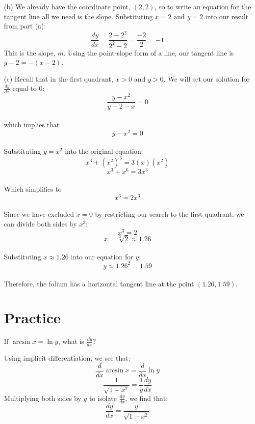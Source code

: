 (b) We already have the coordinate point, $(2, 2)$, so to write an 
equation for the tangent line all we need is the slope. Substituting 
$x=2 \text{ and }y=2$ into our result from part (a):
$$\frac{dy}{dx}=\frac{2-2^2}{2^2-2}=\frac{-2}{2}=-1$$
This is the slope, $m$. Using the point-slope form of a line, our 
tangent line is $y-2=-(x-2)$. 

(c) Recall that in the first quadrant, $x > 0$ and $y > 0$. We will 
set our solution for $\frac{dy}{dx}$  equal to 0:
$$\frac{y-x^2}{y+2-x} = 0$$ \\
which implies that $$y - x^2 = 0$$ \\
Substituting $y = x^2$ into the original equation: 
$$x^3 + (x^2)^3 = 3(x)(x^2)$$ 
$$x^3 + x^6 = 3x^3$$ \\
Which simplifies to 
$$x^6 = 2x^3$$\\
Since we have excluded $x = 0$ by restricting our search to the first 
quadrant, we can divide both sides by $x^3$: 
$$x^3 = 2$$ 
$$x = \sqrt[3]{2} \approx 1.26$$\\
Substituting $x \approx 1.26$ into our equation for $y$: 
$$y \approx 1.26^2 = 1.59$$\\ 
Therefore, the folium has a horizontal tangent line at the point 
$(1.26, 1.59)$.

\section{Practice}
\begin{Exercise} If 
	$\arcsin{x} = \ln{y}$, what is $\frac{dy}{dx}$?
\end{Exercise}

\begin{Answer}[ref=implicit1]
	Using implicit differentiation, we see that:
	$$\frac{d}{dx}\arcsin{x} = \frac{d}{dx}\ln{y}$$
	$$\frac{1}{\sqrt{1-x^2}} = \frac{1}{y}\frac{dy}{dx}$$
	Multiplying both sides by $y$ to isolate $\frac{dy}{dx}$, we find that:
	$$\frac{dy}{dx} = \frac{y}{\sqrt{1-x^2}}$$
\end{Answer}







 
 
 
 
 
 
 
 